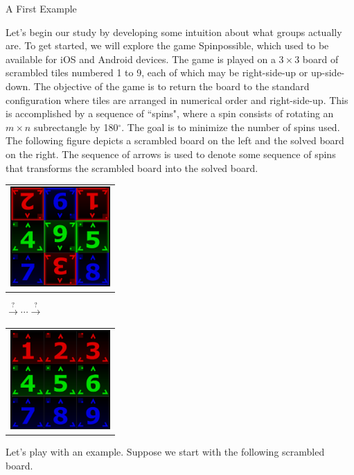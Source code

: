 \begin{section}{A First Example}\label{sec:first_example}


Let's begin our study by developing some intuition about what groups actually are.  To get started, we will explore the game Spinpossible\texttrademark, which used to be available for iOS and Android devices. The game is played on a $3\times 3$ board of scrambled tiles numbered 1 to 9, each of which may be right-side-up or up-side-down. The objective of the game is to return the board to the standard configuration where tiles are arranged in numerical order and right-side-up. This is accomplished by a sequence of ``spins", where a spin consists of rotating an $m\times n$ subrectangle by 180$^\circ$. The goal is to minimize the number of spins used.  The following figure depicts a scrambled board on the left and the solved board on the right.  The sequence of arrows is used to denote some sequence of spins that transforms the scrambled board into the solved board.

\begin{center}
\begin{tabular}{c}\includegraphics[width=1.5in]{scramble1.PNG}\end{tabular}
{\large $\xrightarrow{?} \cdots \xrightarrow{?}$}
\begin{tabular}{c}\includegraphics[width=1.5in]{scramble4.PNG}\end{tabular}
\end{center}

Let's play with an example.  Suppose we start with the following scrambled board.


\end{section}
